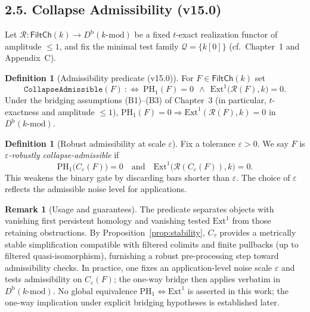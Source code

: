 \documentclass[11pt]{article}
\numberwithin{equation}{section}
\theoremstyle{definition}
\newtheorem{definition}[theorem]{Definition}
\newtheorem{remark}[theorem]{Remark}
\begin{document}
\subsection*{2.5. Collapse Admissibility (v15.0)}
Let \(\mathcal{R}:\mathsf{FiltCh}(k)\to D^{\mathrm{b}}(k\text{-mod})\) be a fixed \(t\)-exact realization functor of amplitude \(\le 1\), and fix the minimal test family \(\mathcal{Q}=\{k[0]\}\) (cf.\ Chapter~1 and Appendix~C).

\begin{definition}[Admissibility predicate (v15.0)]
For \(F\in\mathsf{FiltCh}(k)\) set
\[
\texttt{CollapseAdmissible}(F)\ :\!\!\iff\ \mathrm{PH}_1(F)=0\ \ \wedge\ \ \mathrm{Ext}^1\!\big(\mathcal{R}(F),k\big)=0.
\]
Under the bridging assumptions (B1)–(B3) of Chapter~3 (in particular, $t$-exactness and amplitude $\le 1$), \(\mathrm{PH}_1(F)=0\Rightarrow \mathrm{Ext}^1(\mathcal{R}(F),k)=0\) in \(D^{\mathrm{b}}(k\text{-mod})\).
\end{definition}

\begin{definition}[Robust admissibility at scale \texorpdfstring{$\varepsilon$}{\(\varepsilon\)}]
Fix a tolerance \(\varepsilon>0\). We say \(F\) is \emph{\(\varepsilon\)-robustly collapse-admissible} if
\[
\mathrm{PH}_1\!\big(C_\varepsilon(F)\big)=0\quad\text{and}\quad \mathrm{Ext}^1\!\big(\mathcal{R}(C_\varepsilon(F)),k\big)=0.
\]
This weakens the binary gate by discarding bars shorter than \(\varepsilon\). The choice of \(\varepsilon\) reflects the admissible noise level for applications.
\end{definition}

\begin{remark}[Usage and guarantees]
The predicate separates objects with vanishing first persistent homology and vanishing tested \(\mathrm{Ext}^1\) from those retaining obstructions. By Proposition~\ref{prop:stability}, \(C_\tau\) provides a metrically stable simplification compatible with filtered colimits and finite pullbacks (up to filtered quasi-isomorphism), furnishing a robust pre-processing step toward admissibility checks. In practice, one fixes an application-level noise scale \(\varepsilon\) and tests admissibility on \(C_\varepsilon(F)\); the one-way bridge then applies verbatim in \(D^{\mathrm{b}}(k\text{-mod})\). No global equivalence \(\mathrm{PH}_1\Leftrightarrow \mathrm{Ext}^1\) is asserted in this work; the one-way implication under explicit bridging hypotheses is established later.
\end{remark}
\end{document}
